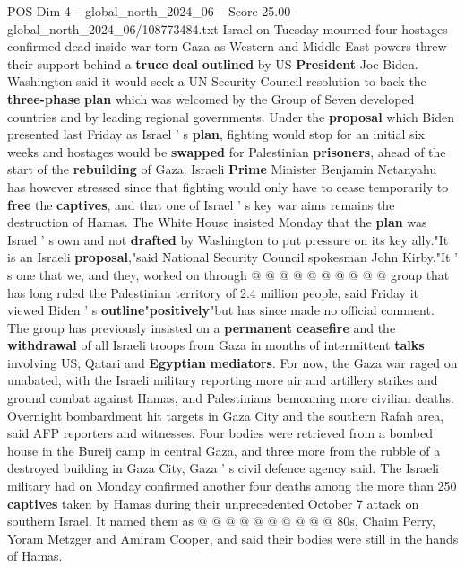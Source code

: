\begin{textsample}{POS Dim 4 – global\_north\_2024\_06 – Score 25.00 – global\_north\_2024\_06/108773484.txt}  \label{ex:f4_pos_135}
Israel on Tuesday mourned four hostages confirmed dead inside war-torn Gaza as Western and Middle East powers threw their support behind a \textbf{truce} \textbf{deal} \textbf{outlined} by US \textbf{President} Joe Biden.
Washington said it would seek a UN Security Council resolution to back the \textbf{three-phase} \textbf{plan} which was welcomed by the Group of Seven developed countries and by leading regional governments.
Under the \textbf{proposal} which Biden presented last Friday as Israel ' s \textbf{plan}, fighting would stop for an initial six weeks and hostages would be \textbf{swapped} for Palestinian \textbf{prisoners}, ahead of the start of the \textbf{rebuilding} of Gaza.
Israeli \textbf{Prime} Minister Benjamin Netanyahu has however stressed since that fighting would only have to cease temporarily to \textbf{free} the \textbf{captives}, and that one of Israel ' s key war aims remains the destruction of Hamas.
The White House insisted Monday that the \textbf{plan} was Israel ' s own and not \textbf{drafted} by Washington to put pressure on its key ally."It is an Israeli \textbf{proposal},"said National Security Council spokesman John Kirby."It ' s one that we, and they, worked on through @ @ @ @ @ @ @ @ @ @ group that has long ruled the Palestinian territory of 2.4 million people, said Friday it viewed Biden ' s \textbf{outline}"\textbf{positively}"but has since made no official comment.
The group has previously insisted on a \textbf{permanent} \textbf{ceasefire} and the \textbf{withdrawal} of all Israeli troops from Gaza in months of intermittent \textbf{talks} involving US, Qatari and \textbf{Egyptian} \textbf{mediators}.
For now, the Gaza war raged on unabated, with the Israeli military reporting more air and artillery strikes and ground combat against Hamas, and Palestinians bemoaning more civilian deaths.
Overnight bombardment hit targets in Gaza City and the southern Rafah area, said AFP reporters and witnesses.
Four bodies were retrieved from a bombed house in the Bureij camp in central Gaza, and three more from the rubble of a destroyed building in Gaza City, Gaza ' s civil defence agency said.
The Israeli military had on Monday confirmed another four deaths among the more than 250 \textbf{captives} taken by Hamas during their unprecedented October 7 attack on southern Israel.
It named them as @ @ @ @ @ @ @ @ @ @ 80s, Chaim Perry, Yoram Metzger and Amiram Cooper, and said their bodies were still in the hands of Hamas.

\end{textsample}
